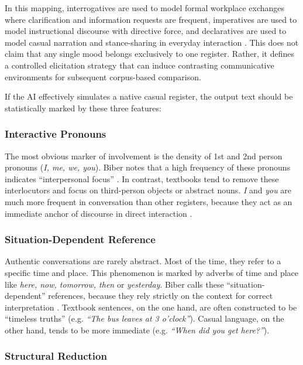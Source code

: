 In this mapping, interrogatives are used to model formal workplace exchanges where clarification and information requests are frequent, imperatives are used to model instructional discourse with directive force, and declaratives are used to model casual narration and stance-sharing in everyday interaction \parencite{huddlestonPullumCambridge2002,quirkComprehensiveGrammar1985}. This does not claim that any single mood belongs exclusively to one register. Rather, it defines a controlled elicitation strategy that can induce contrasting communicative environments for subsequent corpus-based comparison.

If the AI effectively simulates a native casual register, the output text should be statistically marked by these three features:

\subsubsection{Interactive Pronouns}
    
The most obvious marker of involvement is the density of 1st and 2nd person pronouns (\textit{I, me, we, you}). Biber notes that a high frequency of these pronouns indicates ``interpersonal focus'' \parencite[102]{biber1988variation}. In contrast, textbooks tend to remove these interlocutors and focus on third-person objects or abstract nouns. \textit{I} and \textit{you} are much more frequent in conversation than other registers, because they act as an immediate anchor of discourse in direct interaction \parencite[333]{biber1999longman}.
    
\subsubsection{Situation-Dependent Reference}

Authentic conversations are rarely abstract. Most of the time, they refer to a specific time and place. This phenomenon is marked by adverbs of time and place like \textit{here, now, tomorrow, then} or \textit{yesterday}. Biber calls these ``situation-dependent'' references, because they rely strictly on the context for correct interpretation \parencite[37]{biber1988variation}. Textbook sentences, on the one hand, are often constructed to be ``timeless truths'' (e.g. \textit{``The bus leaves at 3 o'clock''}). Casual language, on the other hand, tends to be more immediate (e.g. \textit{``When did you get here?''}).
    
\subsubsection{Structural Reduction}

